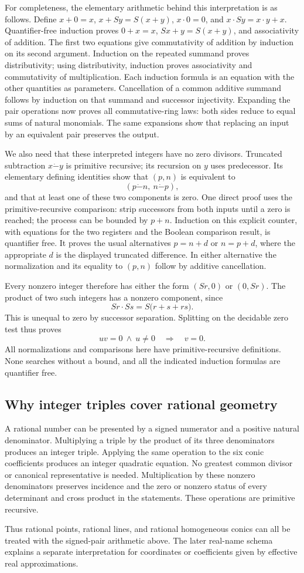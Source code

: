 For completeness, the elementary arithmetic behind this interpretation
is as follows. Define $x+0=x$, $x+S y=S(x+y)$, $x\cdot0=0$, and
$x\cdot S y=x\cdot y+x$. Quantifier-free induction proves
$0+x=x$, $Sx+y=S(x+y)$, and associativity of addition. The first two
equations give commutativity of addition by induction on its second
argument. Induction on the repeated summand proves distributivity;
using distributivity, induction proves associativity and commutativity
of multiplication. Each induction formula is an equation with the other
quantities as parameters. Cancellation of a common additive summand
follows by induction on that summand and successor injectivity.
Expanding the pair operations now proves all commutative-ring laws:
both sides reduce to equal sums of natural monomials. The same expansions
show that replacing an input by an equivalent pair preserves the output.

We also need that these interpreted integers have no zero divisors.
Truncated subtraction $x\mathbin{\dot-}y$ is primitive recursive; its
recursion on $y$ uses predecessor. Its elementary defining identities
show that $(p,n)$ is equivalent to
\[
 (p\mathbin{\dot-}n,\ n\mathbin{\dot-}p),
\]
and that at least one of these two components is zero. One direct proof
uses the primitive-recursive comparison: strip successors from both
inputs until a zero is reached; the process can be bounded by $p+n$.
Induction on this explicit counter, with equations for the two registers
and the Boolean comparison result, is quantifier free. It proves the
usual alternatives $p=n+d$ or $n=p+d$, where the appropriate $d$ is the
displayed truncated difference. In either alternative the normalization
and its equality to $(p,n)$ follow by additive cancellation.

Every nonzero integer therefore has either the form $(S r,0)$ or
$(0,S r)$. The product of two such integers has a nonzero component,
since
\[
 S r\cdot S s=S\bigl(r+s+rs\bigr).
\]
This is unequal to zero by successor separation. Splitting on the
decidable zero test thus proves
\begin{equation}\label{eq:cancel}
 uv=0\ \land\ u\ne0\quad\Longrightarrow\quad v=0.
\end{equation}
All normalizations and comparisons here have primitive-recursive
definitions. None searches without a bound, and all the indicated
induction formulas are quantifier free.

\subsection{Why integer triples cover rational geometry}
A rational number can be presented by a signed numerator and a positive
natural denominator. Multiplying a triple by the product of its three
denominators produces an integer triple. Applying the same operation
to the six conic coefficients produces an integer quadratic equation.
No greatest common divisor or canonical representative is needed.
Multiplication by these nonzero denominators preserves incidence and
the zero or nonzero status of every determinant and cross product in
the statements. These operations are primitive recursive.

Thus rational points, rational lines, and rational homogeneous conics
can all be treated with the signed-pair arithmetic above. The later
real-name schema explains a separate interpretation for coordinates
or coefficients given by effective real approximations.

